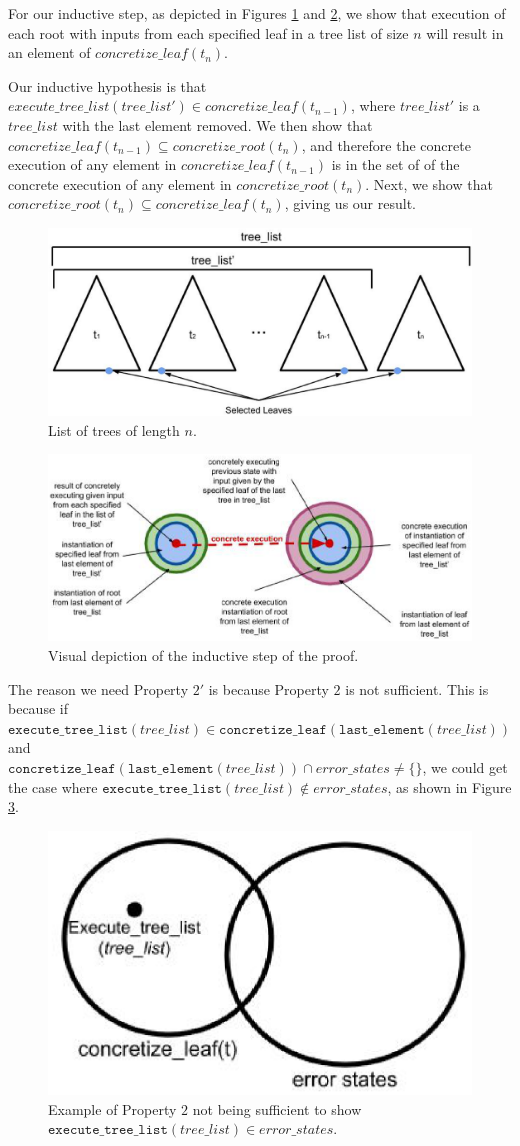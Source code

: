 For our inductive step, as depicted in Figures  \ref{fig:tlist} and \ref{fig:indstep}, we show that execution of each root with inputs from each specified leaf in a tree list of size $n$ will result in an element of $concretize\_leaf(t_n)$.

Our inductive hypothesis is that $execute\_tree\_list (tree\_list') \in concretize\_leaf (t_{n-1})$, where $tree\_list'$ is a $tree\_list$ with the last element removed. We then show that $concretize\_leaf (t_{n-1}) \subseteq concretize\_root (t_{n}) $, and therefore the concrete execution of any element in $concretize\_leaf (t_{n-1}) $ is in the set of of the concrete execution of any element in $concretize\_root (t_{n})$. Next, we show that $concretize\_root (t_{n}) \subseteq concretize\_leaf (t_{n})$, giving us our result.
 
\begin{figure}
\centering
\includegraphics[width=.8\textwidth]{tlist.eps}
\caption{List of trees of length $n$.}
\label{fig:tlist}
\end{figure}

\begin{figure}
\centering
\includegraphics[width=.8\textwidth]{set4.eps}
\caption{Visual depiction of the inductive step of the proof.}
\label{fig:indstep}
\end{figure}




The reason we need Property $2'$ is because Property $2$ is not sufficient. 
This is because if $\mathtt{execute\_tree\_list} (tree\_list) \in \mathtt{concretize\_leaf} (\mathtt{last\_element}(tree\_list))$ and \\
$\mathtt{concretize\_leaf} (\mathtt{last\_element} (tree\_list)) \cap error\_states \neq \{\}$, we could get the case where
$\mathtt{execute\_tree\_list} (tree\_list) \notin error\_states$, as shown in Figure \ref{fig:Prop2}.

\begin{figure}
  \centering
\includegraphics[width=.4\textwidth]{prop2.eps}
\caption{Example of Property $2$ not being sufficient to show $\mathtt{execute\_tree\_list} (tree\_list) \in error\_states$.}
\label{fig:Prop2}
\end{figure}
